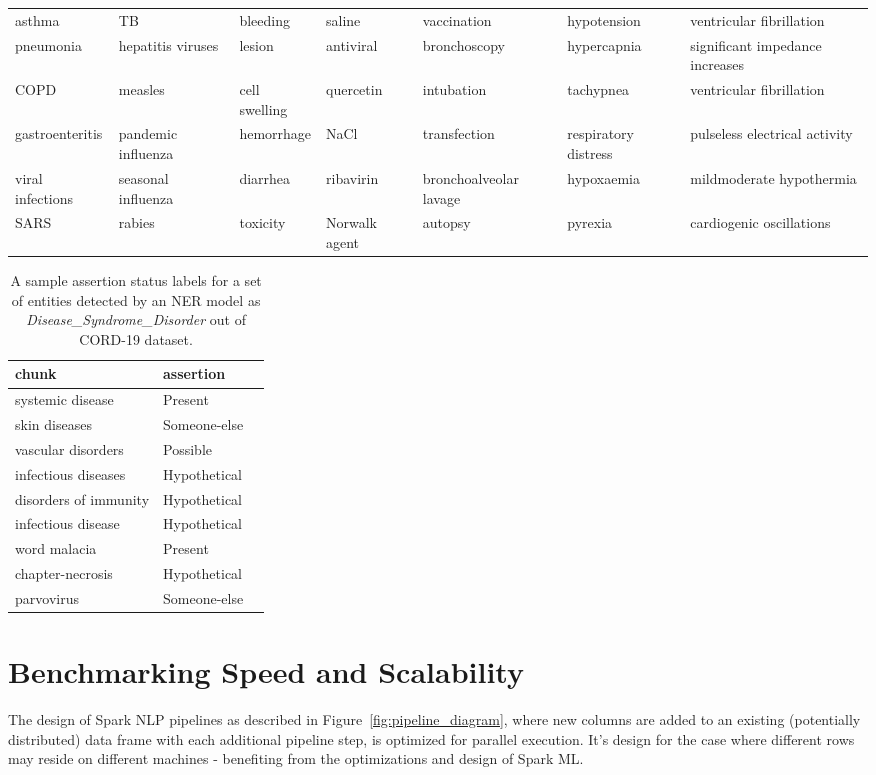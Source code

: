 \documentclass[letterpaper]{article} \usepackage{aaai21}  \usepackage{times}  \usepackage{helvet} \usepackage{courier}  \usepackage[hyphens]{url}  \usepackage{graphicx} \urlstyle{rm} \def\UrlFont{\rm}  \usepackage{natbib}  \usepackage{caption} \frenchspacing  \setlength{\pdfpagewidth}{8.5in}  \setlength{\pdfpageheight}{11in}  \usepackage{lscape}
\begin{document}
\begin{table*}[htb!]
{\begin{tabular}{lllllll}
asthma & TB & bleeding & saline & vaccination & hypotension & ventricular fibrillation \\
pneumonia & hepatitis viruses & lesion & antiviral & bronchoscopy & hypercapnia & significant impedance increases \\
COPD & measles & cell swelling & quercetin & intubation & tachypnea & ventricular fibrillation \\
gastroenteritis & pandemic influenza & hemorrhage & NaCl & transfection & respiratory distress & pulseless electrical activity \\
viral infections & seasonal influenza & diarrhea & ribavirin & bronchoalveolar lavage & hypoxaemia & mildmoderate hypothermia \\
SARS & rabies & toxicity & Norwalk agent & autopsy & pyrexia & cardiogenic oscillations\\
\hline
\end{tabular}
}
\end{table*}

\begin{table}[htb!]
\caption{A sample assertion status labels for a set of entities detected by an NER model as \textit{Disease\_Syndrome\_Disorder} out of CORD-19 dataset.}
\centering
\label{tab:cord_ner_assertions}
\begin{tabular}{lll}
\hline
chunk & assertion \\\hline
systemic disease  & Present \\
skin diseases & Someone-else \\
vascular disorders & Possible \\
infectious diseases & Hypothetical \\
disorders of immunity & Hypothetical \\
infectious disease & Hypothetical \\
word malacia & Present \\
chapter-necrosis & Hypothetical \\
parvovirus & Someone-else \\\hline
\end{tabular}
\end{table}


\section{Benchmarking Speed and Scalability}
\label{sec:scaling}

The design of Spark NLP pipelines as described in Figure~\ref{fig:pipeline_diagram}, where new columns are added to an existing (potentially distributed) data frame with each additional pipeline step, is optimized for parallel execution. It's design for the case where different rows may reside on different machines - benefiting from the optimizations and design of Spark ML.
\end{document}
